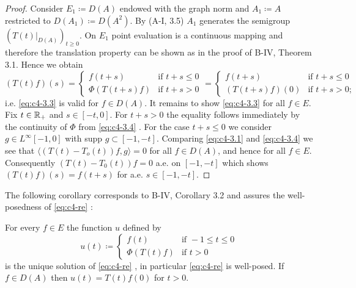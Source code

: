 \begin{proof}
Consider $E_1 \coloneqq D(A)$ endowed with the graph norm and $A_1 \coloneqq A$ restricted to $D(A_1) \coloneqq D(A^{2})$.
By (A-I, 3.5) $A_1$ generates the semigroup $(T(t)|_{D(A)})_{t \geq 0}$.
On $E_1$ point evaluation is a continuous mapping and therefore the translation property can be shown as in the proof of B-IV, Theorem 3.1.
Hence we obtain
\begin{equation}\label{eq:c4-3.4}
(T(t)f)(s)= \begin{cases}
    f(t+s) &\text{if } t+s \leq 0 \\
    \Phi(T(t+s)f) &\text{if } t+s > 0
\end{cases} = \begin{cases}
    f(t+s) &\text{if } t+s \leq 0 \\
    (T(t+s)f)(0) &\text{if } t+s > 0;
\end{cases}
\end{equation}
i.e. \eqref{eq:c4-3.3} is valid for $f \in D(A)$.
It remains to show \eqref{eq:c4-3.3} for all $f \in E$.
Fix $t \in \mathbb{R}_+$ and $s \in [-t,0]$.
For $t + s > 0$ the equality follows immediately by the continuity of $\Phi$ from \eqref{eq:c4-3.4} .
For the case $t + s \leq 0$ we consider $g \in L^{\infty}[-1,0]$ with supp $g \subset [-1,-t]$.
Comparing \eqref{eq:c4-3.1} and \eqref{eq:c4-3.4} we see that $\langle(T(t)-T_o(t))f,g\rangle = 0$ for all $f \in D(A)$, and hence for all $f \in E$.
Consequently $(T(t)-T_{0}(t))f = 0$ a.e. on $[-1,-t]$ which shows $(T(t)f)(s) = f(t+s)$ for a.e. $s \in [-1,-t]$.
\end{proof}

The following corollary corresponds to B-IV, Corollary 3.2 and assures the well-posedness of \eqref{eq:c4-re} :

\begin{corollary}\label{cor:c4-3.2}
For every $f \in E$ the function $u$ defined by
\begin{equation}\label{eq:c4-3.5}
u(t) \coloneqq  \begin{cases}
    f(t) & \text{if } -1 \leq t \leq 0 \\
    \Phi(T(t)f) & \text{if } t > 0
\end{cases}
\end{equation}
is the unique solution of \eqref{eq:c4-re} , in particular \eqref{eq:c4-re} is well-posed.
If $f \in D(A)$ then $u(t) = T(t)f(0)$ for $t > 0$.
\end{corollary}

